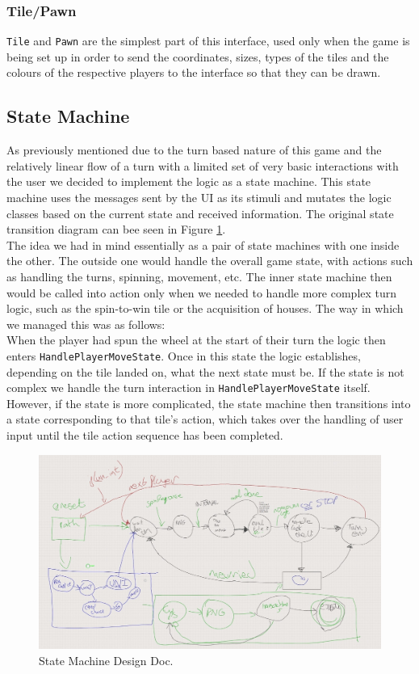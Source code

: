 \documentclass[a4paper, 11pt]{article}
\begin{document}
	\subsubsection*{Tile/Pawn}
	\texttt{Tile} and \texttt{Pawn} are the simplest part of this interface, used only when the game is being set up in order to send the coordinates, sizes, types of the tiles and the colours of the respective players to the interface so that they can be drawn.	
	\subsection*{State Machine}
	As previously mentioned due to the turn based nature of this game and the relatively linear flow of a turn with a limited set of very basic interactions with the user we decided to implement the logic as a state machine. This state machine uses the messages sent by the UI as its stimuli and mutates the logic classes based on the current state and received information. The original state transition diagram can bee seen in Figure \ref{fig:state_machine}.\\
	The idea we had in mind essentially as a pair of state machines with one inside the other. The outside one would handle the overall game state, with actions such as handling the turns, spinning, movement, etc. The inner state machine then would be called into action only when we needed to handle more complex turn logic, such as the spin-to-win tile or the acquisition of houses. The way in which we managed this was as follows:\\
	When the player had spun the wheel at the start of their turn the logic then enters \texttt{HandlePlayerMoveState}. Once in this state the logic establishes, depending on the tile landed on, what the next state must be. If the state is not complex we handle the turn interaction in \texttt{HandlePlayerMoveState} itself. However, if the state is more complicated, the state machine then transitions into a state corresponding to that tile's action, which takes over the handling of user input until the tile action sequence has been completed.
	\begin{figure}[!h]
		\centering
		\includegraphics[scale=.33]{highlevel_state_diagram}
		\caption{State Machine Design Doc.}
		\label{fig:state_machine}
	\end{figure}
\end{document}

